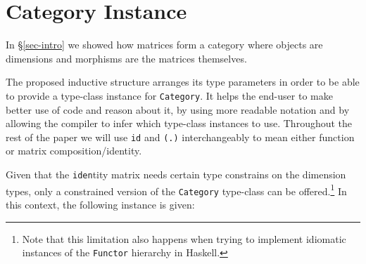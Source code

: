 \documentclass[sigplan,screen]{acmart}
\newcommand{\hs}{\texttt}
\begin{document}
%
%
%

\section{Category Instance}\label{sec:cat}

In \S\ref{sec-intro} we showed how matrices form a category where objects are dimensions and morphisms are the matrices themselves.

The proposed inductive structure arranges its type parameters in order to be able to provide a type-class instance for \hs{Category}. It helps the end-user to make better use of code and reason about it, by using more readable notation and by allowing the compiler to infer which type-class instances to use. Throughout the rest of the paper we will use \hs{id} and \hs{(.)} interchangeably to mean either function or matrix composition/identity.

Given that the \hs{iden}tity matrix needs certain type constrains on the dimension types, only a constrained version of the \hs{Category} type-class can be offered.\footnote{Note that this limitation also happens when trying to implement idiomatic instances of the \hs{Functor} hierarchy in Haskell.
} In this context, the following instance is given:
\end{document}
